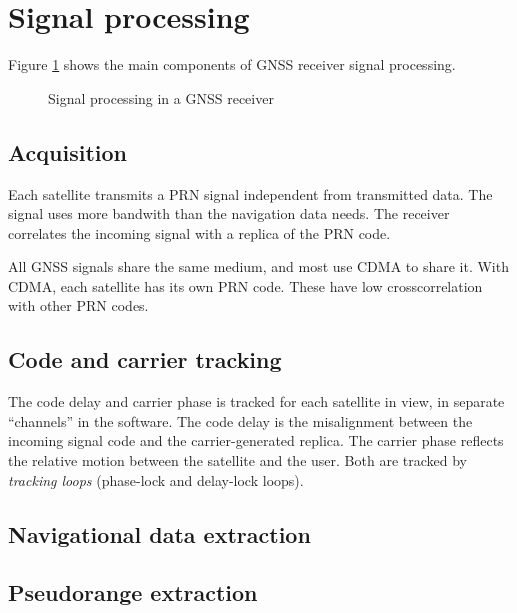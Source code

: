 \section{Signal processing}
Figure \ref{fig:signal-diagram} shows the main components of GNSS receiver signal processing.

\begin{figure}[htbp]
	\centering
	\label{fig:signal-diagram}
	
	\caption{Signal processing in a GNSS receiver}
\end{figure}

\subsection{Acquisition}

Each satellite transmits a PRN signal independent from transmitted data. The signal uses more bandwith than the navigation data needs. The receiver correlates the incoming signal with a replica of the PRN code.

All GNSS signals share the same medium, and most use CDMA to share it. With CDMA, each satellite has its own PRN code. These have low crosscorrelation with other PRN codes.

\subsection{Code and carrier tracking}
The code delay and carrier phase is tracked for each satellite in view, in separate ``channels'' in the software. The code delay is the misalignment between the incoming signal code and the carrier-generated replica. The carrier phase reflects the relative motion between the satellite and the user. Both are tracked by \emph{tracking loops} (phase-lock and delay-lock loops).

\subsection{Navigational data extraction}


\subsection{Pseudorange extraction}
